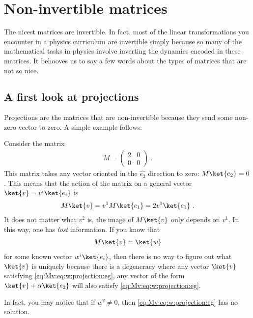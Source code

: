 
\section{Non-invertible matrices}

The nicest matrices are invertible. In fact, most of the linear transformations you encounter in a physics curriculum are invertible simply because so many of the mathematical tasks in physics involve inverting the dynamics encoded in these matrices. It behooves us to say a few words about the types of matrices that are not so nice.

\subsection{A first look at projections}

Projections are the matrices that are non-invertible because they send some non-zero vector to zero. A simple example follows:
\begin{example}
Consider the matrix
\begin{align}
    M = 
    \begin{pmatrix}
        2 & 0 \\
        0 & 0
    \end{pmatrix} \ .
\end{align}
This matrix takes any vector oriented in the $\hat{e_2}$ direction to zero: $M\ket{e_2} = 0$. This means that the action of the matrix on a general vector $\ket{v} = v^i\ket{e_i}$ is
\begin{align}
    M \ket{v} = v^1 M\ket{e_1} = 2 v^1 \ket{e_1} \ .
\end{align}
It does not matter what $v^2$ is, the image of $M\ket{v}$ only depends on $v^1$. In this way, one has \emph{lost} information. If you know that
\begin{align}
    M\ket{v} = \ket{w}
    \label{eq:Mv:eq:w:projection:eg}
\end{align}
for some known vector $w^i\ket{e_i}$, then there is no way to figure out what $\ket{v}$ is uniquely because there is a degeneracy where any vector $\ket{v}$ satisfying \eqref{eq:Mv:eq:w:projection:eg}, any vector of the form $\ket{v} + \alpha\ket{e_2}$ will also satisfy \eqref{eq:Mv:eq:w:projection:eg}. 

In fact, you may notice that if $w^2 \neq 0$, then \eqref{eq:Mv:eq:w:projection:eg} has no solution.
\end{example}

